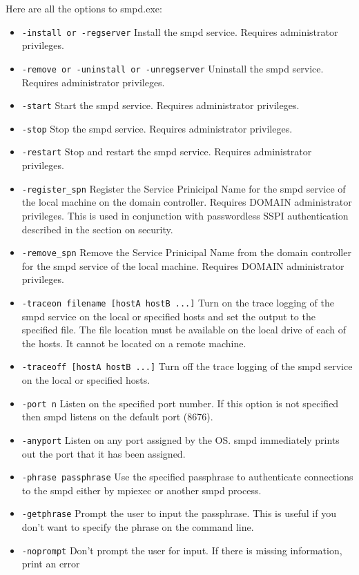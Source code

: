 \documentclass[dvipdfm,11pt]{article}
\begin{document}
Here are all the options to smpd.exe:
\begin{itemize}
\item \texttt{-install or -regserver}
Install the smpd service.  Requires administrator privileges.
\item \texttt{-remove or -uninstall or -unregserver}
Uninstall the smpd service.  Requires administrator privileges.
\item \texttt{-start}
Start the smpd service.  Requires administrator privileges.
\item \texttt{-stop}
Stop the smpd service.  Requires administrator privileges.
\item \texttt{-restart}
Stop and restart the smpd service.  Requires administrator privileges.
\item \texttt{-register\_spn}
Register the Service Prinicipal Name for the smpd service of the local machine
on the domain controller.  Requires DOMAIN administrator privileges.  This is
used in conjunction with passwordless SSPI authentication described in the
section on security.
\item \texttt{-remove\_spn}
Remove the Service Prinicipal Name from the domain controller for the smpd service
of the local machine.  Requires DOMAIN administrator privileges.
\item \texttt{-traceon filename [hostA hostB ...]}
Turn on the trace logging of the smpd service on the local or specified hosts
and set the output to the specified file.  The file location must be available
on the local drive of each of the hosts.  It cannot be located on a remote 
machine.
\item \texttt{-traceoff [hostA hostB ...]}
Turn off the trace logging of the smpd service on the local or specified hosts.
\item \texttt{-port n}
Listen on the specified port number.  If this option is not specified then smpd
listens on the default port (8676).
\item \texttt{-anyport}
Listen on any port assigned by the OS.  smpd immediately prints out the port that
it has been assigned.
\item \texttt{-phrase passphrase}
Use the specified passphrase to authenticate connections to the smpd either by
mpiexec or another smpd process.
\item \texttt{-getphrase}
Prompt the user to input the passphrase.  This is useful if you don't want to 
specify the phrase on the command line.
\item \texttt{-noprompt}
Don't prompt the user for input.  If there is missing information, print an error

\end{itemize}
\end{document}
